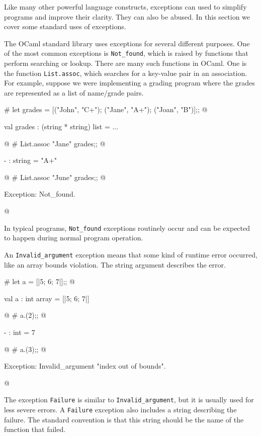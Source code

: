 
Like many other powerful language constructs, exceptions can used to simplify programs and improve
their clarity.  They can also be abused.  In this section we cover some standard uses of exceptions.


The OCaml standard library uses exceptions for several different purposes.  One of the most common
exceptions is \hbox{\lstinline/Not_found/}, which is raised by functions that perform searching or lookup.
There are many such functions in OCaml.  One is the function \hbox{\lstinline/List.assoc/}, which
searches for a key-value pair in an association.  For example, suppose we were implementing a
grading program where the grades are represented as a list of name/grade pairs.

\begin{ocaml}
# let grades = [("John", "C+"); ("Jane", "A+"); ("Joan", "B")];;
@
\begin{topoutput}
val grades : (string * string) list = ...
\end{topoutput}
@
# List.assoc "Jane" grades;;
@
\begin{topoutput}
- : string = "A+"
\end{topoutput}
@
# List.assoc "June" grades;;
@
\begin{toperror}
Exception: Not_found.
\end{toperror}
@
\end{ocaml}
%
In typical programs, \hbox{\lstinline/Not_found/} exceptions routinely occur and can be expected to
happen during normal program operation.


An \hbox{\lstinline/Invalid_argument/} exception means that some kind of runtime error occurred,
like an array bounds violation.  The string argument describes the error.

\begin{ocaml}
# let a = [|5; 6; 7|];;
@
\begin{topoutput}
val a : int array = [|5; 6; 7|]
\end{topoutput}
@
# a.(2);;
@
\begin{topoutput}
- : int = 7
\end{topoutput}
@
# a.(3);;
@
\begin{toperror}
Exception: Invalid_argument "index out of bounds".
\end{toperror}
@
\end{ocaml}
%
The exception \hbox{\lstinline/Failure/} is similar to \hbox{\lstinline/Invalid_argument/}, but it
is usually used for less severe errors.  A \hbox{\lstinline/Failure/} exception also includes a
string describing the failure.  The standard convention is that this string should be the name of the
function that failed.

